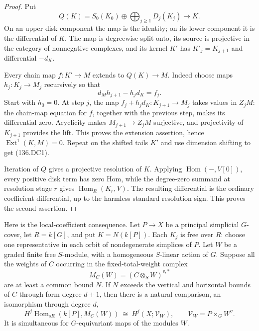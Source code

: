 \begin{proof}
Put
\[
 Q(K)=S_0(K_0)\oplus\bigoplus_{j\geq1}D_j(K_j)
                  \longrightarrow K .
\]
On an upper disk component the map is the identity; on its lower
component it is the differential of \(K\). The map is degreewise split
onto, its source is projective in the category of nonnegative
complexes, and its kernel \(K'\) has
\(K'_j=K_{j+1}\) and differential \(-d_K\).

Every chain map \(f:K'\to M\) extends to \(Q(K)\to M\).
Indeed choose maps \(h_j:K_j\to M_j\) recursively so that
\[
             d_Mh_{j+1}-h_jd_K=f_j .
\]
Start with \(h_0=0\). At step \(j\), the map
\(f_j+h_jd_K:K_{j+1}\to M_j\) takes values in \(Z_jM\):
the chain-map equation for \(f\), together with the previous step,
makes its differential zero. Acyclicity makes
\(M_{j+1}\to Z_jM\) surjective, and projectivity of \(K_{j+1}\)
provides the lift. This proves the extension assertion, hence
\(\operatorname{Ext}^1(K,M)=0\). Repeat on the shifted tails \(K'\)
and use dimension shifting to get (136.DC1).

Iteration of \(Q\) gives a projective resolution of \(K\).
Applying \(\operatorname{Hom}(-,V[0])\), every positive disk term has
zero Hom, while the degree-zero summand at resolution stage \(r\)
gives \(\operatorname{Hom}_R(K_r,V)\). The resulting differential is
the ordinary coefficient differential, up to the harmless standard
resolution sign. This proves the second assertion.
\end{proof}

Here is the local-coefficient consequence. Let \(P\to X\) be a principal
simplicial \(G\)-cover, let \(R=k[G]\), and put \(K=N(k[P])\).
Each \(K_j\) is free over \(R\): choose one representative in each orbit
of nondegenerate simplices of \(P\).
Let \(W\) be a graded finite free \(S\)-module, with a homogeneous
\(S\)-linear action of \(G\). Suppose all the weights of \(C\) occurring
in the fixed-total-weight complex
\[
             M_C(W)=(C\otimes_S W)^{v,*}              \tag{136.DC2}
\]
are at least a common bound \(N\). If \(N\) exceeds the vertical and
horizontal bounds of \(C\) through form degree \(d+1\), then there is a
natural comparison, an isomorphism through degree \(d\),
\[
 H^j\operatorname{Hom}_{sR}(k[P],M_C(W))
     \ \cong\ H^j(X;\mathscr V_W),\qquad
 \mathscr V_W=P\times_G W^v .                        \tag{136.DC3}
\]
It is simultaneous for \(G\)-equivariant maps of the modules \(W\).

